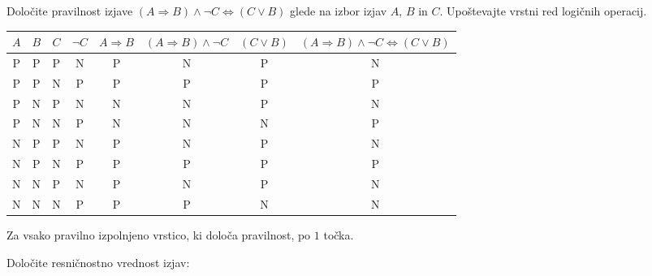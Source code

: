 \documentclass[addpoints]{exam}
\begin{document}
\begin{questions}

    
    \question[8]
    Določite pravilnost izjave $(A\Rightarrow  B)\land \lnot C \Leftrightarrow (C\lor B)$ glede na izbor izjav $A$, $B$ in $C$. Upoštevajte vrstni red logičnih operacij.

    \begin{solution}[10cm]
        \begin{table}[H]
            \begin{tabular}{cccccccc}
             $A$ & $B$ & $C$ & $\lnot C$ & $A\Rightarrow B$ & $(A\Rightarrow B)\land\lnot C$ & $(C\lor B)$ & $(A\Rightarrow  B)\land \lnot C \Leftrightarrow (C\lor B)$\\ \hline
             P & P & P & N & P & N & P & N \\ 
             P & P & N & P & P & P & P & P \\
             P & N & P & N & N & N & P & N \\
             P & N & N & P & N & N & N & P \\
             N & P & P & N & P & N & P & N \\ 
             N & P & N & P & P & P & P & P \\
             N & N & P & N & P & N & P & N \\
             N & N & N & P & P & P & N & N
            \end{tabular}
        \end{table}
        Za vsako pravilno izpolnjeno vrstico, ki določa pravilnost, po $1$ točka.
    \end{solution}




    \question[3]
    Določite resničnostno vrednost izjav:


\end{questions}
\end{document}
